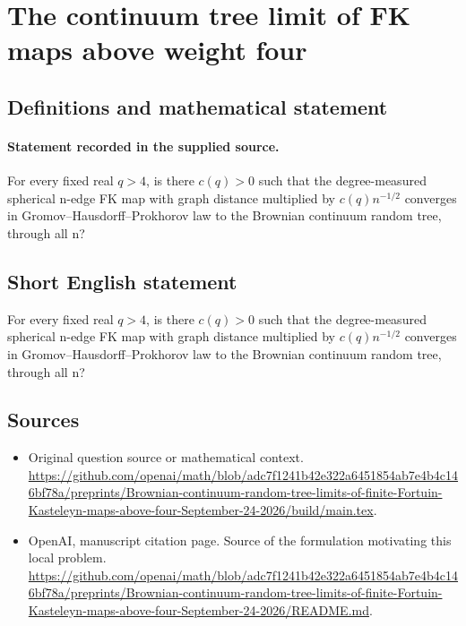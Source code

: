 \documentclass[11pt]{article}
\begin{document}
\section*{The continuum tree limit of FK maps above weight four}\label{statement}
\subsection{Definitions and mathematical statement}
\paragraph{Statement recorded in the supplied source.}
For every fixed real $q>4$, is there $c(q)>0$ such that the degree-measured spherical n-edge FK map with graph distance multiplied by $c(q)n^{-1/2}$ converges in Gromov–Hausdorff–Prokhorov law to the Brownian continuum random tree, through all n?
\subsection{Short English statement}
For every fixed real $q>4$, is there $c(q)>0$ such that the degree-measured spherical n-edge FK map with graph distance multiplied by $c(q)n^{-1/2}$ converges in Gromov–Hausdorff–Prokhorov law to the Brownian continuum random tree, through all n?
\subsection{Sources}
\begin{itemize}
\item[S1] Original question source or mathematical context.
\url{https://github.com/openai/math/blob/adc7f1241b42e322a6451854ab7e4b4c146bf78a/preprints/Brownian-continuum-random-tree-limits-of-finite-Fortuin-Kasteleyn-maps-above-four-September-24-2026/build/main.tex}.
\item[S2] OpenAI, manuscript citation page. Source of the formulation motivating this local problem.
\url{https://github.com/openai/math/blob/adc7f1241b42e322a6451854ab7e4b4c146bf78a/preprints/Brownian-continuum-random-tree-limits-of-finite-Fortuin-Kasteleyn-maps-above-four-September-24-2026/README.md}.
\end{itemize}
\end{document}
